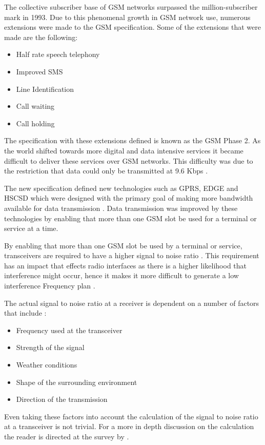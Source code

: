 The collective subscriber base of GSM networks surpassed the million-subscriber mark in 1993. Due to this phenomenal growth in GSM network use, numerous extensions were made to the GSM specification. 
Some of the extensions that were made are the following\cite{Eisenblatter}:
\begin{itemize}
\item Half rate speech telephony
\item Improved SMS
\item Line Identification
\item Call waiting
\item Call holding
\end{itemize}
The specification with these extensions defined is known as the GSM Phase 2. As the world shifted towards more digital and data intensive services it became difficult to deliver these services over GSM networks. This difficulty was due to the restriction that data could only be transmitted at 9.6 Kbps \cite{GSM92}.

The new specification defined new technologies such as GPRS, EDGE and HSCSD which were designed with the primary goal of making more bandwidth available for data transmission \cite{GSMArchitectureProtocolsServices}. Data transmission was improved by these technologies by enabling that more than one GSM slot be used for a terminal or service at a time\cite{GSMArchitectureProtocolsServices}.

By enabling that more than one GSM slot be used by a terminal or service, transceivers are required to have a higher signal to noise ratio \cite{GSMArchitectureProtocolsServices}. This requirement has an impact that effects radio interfaces as there is a higher likelihood that interference might occur, hence it makes it more difficult to generate a low interference Frequency plan \cite{Eisenblatter}. 

The actual signal to noise ratio at a receiver is dependent on a number of factors that include \cite{GSMArchitectureProtocolsServices,Karen2004}:
\begin{itemize}
\item Frequency used at the transceiver
\item Strength of the signal
\item Weather conditions
\item Shape of the surrounding environment
\item Direction of the transmission
\end{itemize}
Even taking these factors into account the calculation of the signal to noise ratio at a transceiver is not trivial. For a more in depth discussion on the calculation the reader is directed at the survey by \cite{Karen2004}.

